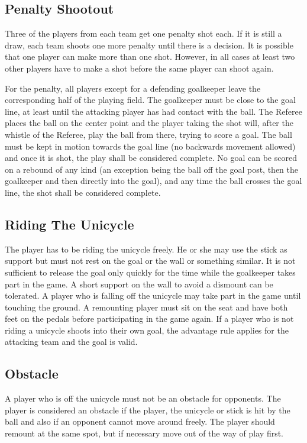 \subsection{Penalty Shootout}
Three of the players from each team get one penalty shot each.
If it is still a draw, each team shoots one more penalty until there is a decision.
It is possible that one player can make more than one shot.
However, in all cases at least two other players have to make a shot before the same player can shoot again.

For the penalty, all players except for a defending goalkeeper leave the corresponding half of the playing field.
The goalkeeper must be close to the goal line, at least until the attacking player has had contact with the ball.
The Referee places the ball on the center point and the player taking the shot will, after the whistle of the Referee, play the ball from there, trying to score a goal.
The ball must be kept in motion towards the goal line (no backwards movement allowed) and once it is shot, the play shall be considered complete.
No goal can be scored on a rebound of any kind (an exception being the ball off the goal post, then the goalkeeper and then directly into the goal), and any time the ball crosses the goal line, the shot shall be considered complete.

\subsection{Riding The Unicycle}
The player has to be riding the unicycle freely.
He or she may use the stick as support but must not rest on the goal or the wall or something similar.
It is not sufficient to release the goal only quickly for the time while the goalkeeper takes part in the game.
A short support on the wall to avoid a dismount can be tolerated.
A player who is falling off the unicycle may take part in the game until touching the ground.
A remounting player must sit on the seat and have both feet on the pedals before participating in the game again.
If a player who is not riding a unicycle shoots into their own goal, the advantage rule applies for the attacking team and the goal is valid.

\subsection{Obstacle}
A player who is off the unicycle must not be an obstacle for opponents.
The player is considered an obstacle if the player, the unicycle or stick is hit by the ball and also if an opponent cannot move around freely.
The player should remount at the same spot, but if necessary move out of the way of play first.

